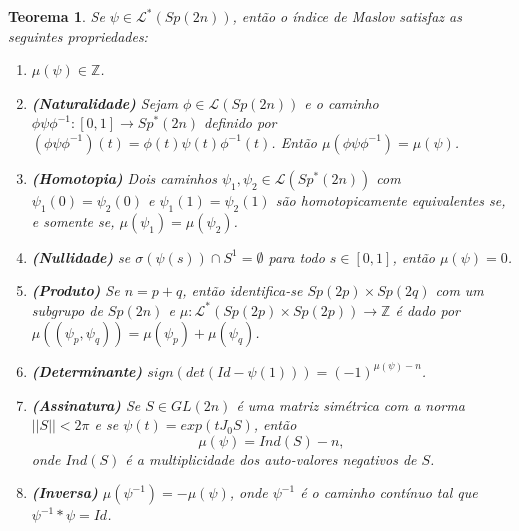 \documentclass[12pt]{book}
\newtheorem{teorema}{Teorema}[section]
\newcommand{\caminhosespeciais}[1]{\mathcal{L}^{*}(#1)}
\newcommand{\caminhos}{\mathcal{L}}
\newcommand{\caminhossempontobase}[1]{\caminhos(#1)}
\newcommand{\circulo}{S^{1}}
\newcommand{\espectrooperador}[1]{\sigma(#1)}
\newcommand{\estruturacomplexa}{J_{0}}
\newcommand{\gruposimpletico}[1]{Sp(#1)}
\newcommand{\gruposimpleticonaodegenerado}[1]{Sp^{#1}(2n)}
\newcommand{\inteiros}{\mathbb{Z}}
\newcommand{\intervalo}{[0,1]}
\begin{document}
	
	\begin{teorema}\label{teorema_indice_maslov}
		Se $\psi \in \caminhosespeciais{\gruposimpletico{2n}}$, então o índice de Maslov satisfaz as seguintes propriedades:
		\begin{enumerate}
			\item $\mu(\psi) \in \inteiros$.
			
			\item \textbf{(Naturalidade)} Sejam $\phi\in \caminhossempontobase{\gruposimpletico{2n}}$ e o caminho $\phi\psi\phi^{-1}: \intervalo \to \gruposimpleticonaodegenerado{*}$ definido por $(\phi\psi\phi^{-1})(t) = \phi(t)\psi(t)\phi^{-1}(t)$. Então $\mu(\phi\psi\phi^{-1}) = \mu(\psi)$.
			
			\item \textbf{(Homotopia)} \label{homotopia_caminhos_teorema_indice_maslov} Dois caminhos $\psi_{1}, \psi_{2}\in \caminhos({\gruposimpleticonaodegenerado{*}}) $ com $\psi_{1}(0) = \psi_{2}(0)$ e $\psi_{1}(1) = \psi_{2}(1)$ são homotopicamente equivalentes se, e somente se, $\mu(\psi_{1}) = \mu(\psi_{2})$.
			
			\item \textbf{(Nullidade)} se $\espectrooperador{\psi(s)}\cap \circulo = \emptyset$ para todo $s\in \intervalo$, então $\mu(\psi) = 0$.
			
			\item \textbf{(Produto)} Se $n=p+q$, então identifica-se $\gruposimpletico{2p}\times \gruposimpletico{2q}$ com um subgrupo de $\gruposimpletico{2n}$ e $\mu:\caminhosespeciais{\gruposimpletico{2p}\times \gruposimpletico{2p}} \to \inteiros$ é dado por $\mu((\psi_{p}, \psi_{q})) = \mu(\psi_{p})+\mu(\psi_{q})$.
			
			\item \textbf{(Determinante)} $sign(det(Id-\psi(1))) = (-1)^{\mu(\psi)-n}$.
			
			\item \textbf{(Assinatura)} Se $S \in GL(2n)$ é uma matriz simétrica com a norma $||S|| < 2\pi$ e se $\psi(t) = exp(t\estruturacomplexa S)$, então 
			$$
			\mu(\psi) = Ind(S) - n,
			$$
			onde $Ind(S)$ é a multiplicidade dos auto-valores negativos de $S$.
			
			\item \textbf{(Inversa)} $\mu(\psi^{-1}) = -\mu(\psi)$, onde $\psi^{-1} $ é o caminho contínuo tal que $\psi^{-1}*\psi = Id$.
			
		\end{enumerate}
	\end{teorema}
\end{document}
